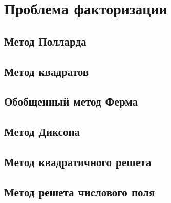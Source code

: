 \section{Проблема факторизации}

\subsection{Метод Полларда}

\subsection{Метод квадратов}

\subsection{Обобщенный метод Ферма}

\subsection{Метод Диксона}

\subsection{Метод квадратичного решета}

\subsection{Метод решета числового поля}